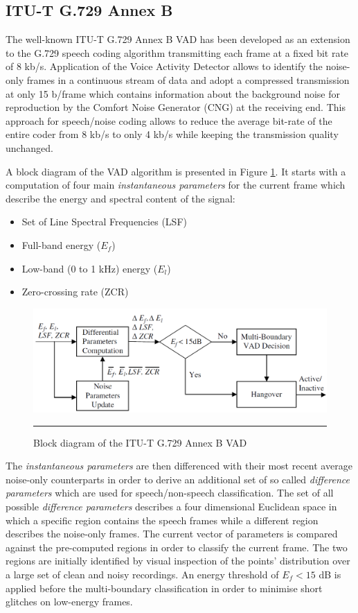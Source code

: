 \subsection{ITU-T G.729 Annex B}

The well-known ITU-T G.729 Annex B VAD has been developed as an extension to the G.729 speech coding algorithm \citep{G729Original} transmitting each frame at a fixed bit rate of 8 kb/s. Application of the Voice Activity Detector allows to identify the noise-only frames in a continuous stream of data and adopt a compressed transmission at only 15 b/frame which contains information about the background noise for reproduction by the Comfort Noise Generator (CNG) at the receiving end. This approach for speech/noise coding allows to reduce the average bit-rate of the entire coder from 8 kb/s to only 4 kb/s while keeping the transmission quality unchanged.

A block diagram of the VAD algorithm is presented in Figure \ref{fig:G729AnnexB}. It starts with a computation of four main \emph{instantaneous parameters} for the current frame which describe the energy and spectral content of the signal:
\begin{itemize}
\item Set of Line Spectral Frequencies (LSF)
\item Full-band energy ($E_f$)
\item Low-band (0 to 1 kHz) energy ($E_l$)
\item Zero-crossing rate (ZCR)
\end{itemize}

\begin{figure}[htbp]
	\centering
		\includegraphics[width=0.9\columnwidth]{Figures/Chapter2/G729AnnexB.png}
		\rule{37em}{0.5pt}
	\caption[Block diagram of the ITU-T G.729 Annex B VAD]{Block diagram of the ITU-T G.729 Annex B VAD \cite{Kondoz}}
	\label{fig:G729AnnexB}
\end{figure}

The \emph{instantaneous parameters} are then differenced with their most recent average noise-only counterparts in order to derive an additional set of so called \emph{difference parameters} which are used for speech/non-speech classification. The set of all possible \emph{difference parameters} describes a four dimensional Euclidean space in which a specific region contains the speech frames while a different region describes the noise-only frames. The current vector of parameters is compared against the pre-computed regions in order to classify the current frame. The two regions are initially identified by visual inspection of the points' distribution over a large set of clean and noisy recordings. An energy threshold of $E_f < 15$ dB is applied before the multi-boundary classification in order to minimise short glitches on low-energy frames.

